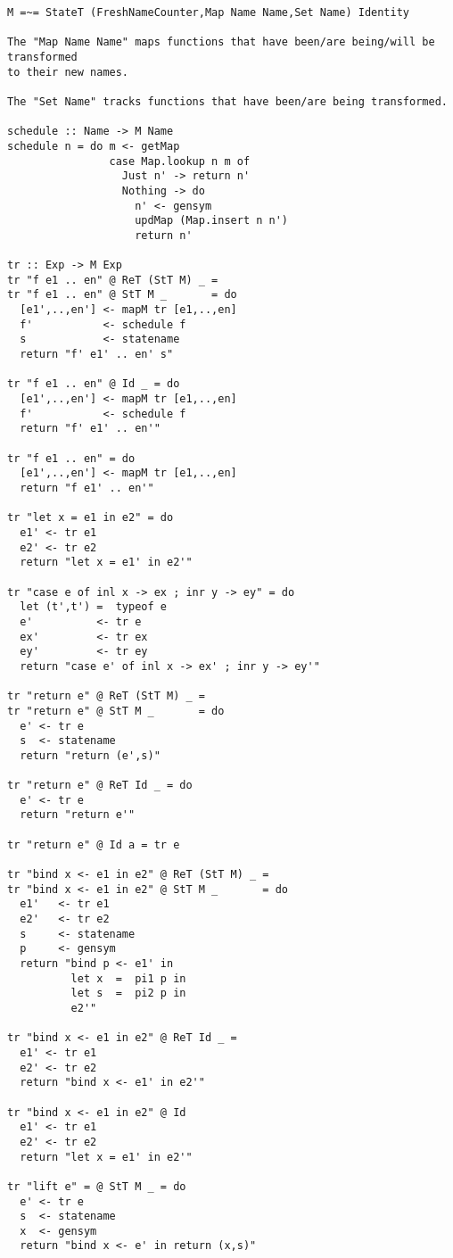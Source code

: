 \documentclass{article}[11pt]
\begin{document}
\begin{verbatim}
M =~= StateT (FreshNameCounter,Map Name Name,Set Name) Identity

The "Map Name Name" maps functions that have been/are being/will be transformed
to their new names.

The "Set Name" tracks functions that have been/are being transformed.

schedule :: Name -> M Name
schedule n = do m <- getMap
                case Map.lookup n m of
                  Just n' -> return n'
                  Nothing -> do
                    n' <- gensym
                    updMap (Map.insert n n')
                    return n'

tr :: Exp -> M Exp
tr "f e1 .. en" @ ReT (StT M) _ =
tr "f e1 .. en" @ StT M _       = do
  [e1',..,en'] <- mapM tr [e1,..,en]
  f'           <- schedule f
  s            <- statename
  return "f' e1' .. en' s"

tr "f e1 .. en" @ Id _ = do
  [e1',..,en'] <- mapM tr [e1,..,en]
  f'           <- schedule f
  return "f' e1' .. en'"

tr "f e1 .. en" = do
  [e1',..,en'] <- mapM tr [e1,..,en]
  return "f e1' .. en'"

tr "let x = e1 in e2" = do
  e1' <- tr e1
  e2' <- tr e2
  return "let x = e1' in e2'"

tr "case e of inl x -> ex ; inr y -> ey" = do
  let (t',t') =  typeof e
  e'          <- tr e
  ex'         <- tr ex
  ey'         <- tr ey
  return "case e' of inl x -> ex' ; inr y -> ey'"
  
tr "return e" @ ReT (StT M) _ =
tr "return e" @ StT M _       = do
  e' <- tr e
  s  <- statename
  return "return (e',s)"

tr "return e" @ ReT Id _ = do
  e' <- tr e
  return "return e'"

tr "return e" @ Id a = tr e

tr "bind x <- e1 in e2" @ ReT (StT M) _ =
tr "bind x <- e1 in e2" @ StT M _       = do
  e1'   <- tr e1
  e2'   <- tr e2
  s     <- statename
  p     <- gensym
  return "bind p <- e1' in
          let x  =  pi1 p in
          let s  =  pi2 p in
          e2'"

tr "bind x <- e1 in e2" @ ReT Id _ =
  e1' <- tr e1
  e2' <- tr e2
  return "bind x <- e1' in e2'"

tr "bind x <- e1 in e2" @ Id
  e1' <- tr e1
  e2' <- tr e2
  return "let x = e1' in e2'"

tr "lift e" = @ StT M _ = do
  e' <- tr e
  s  <- statename
  x  <- gensym
  return "bind x <- e' in return (x,s)"


\end{verbatim}
\end{document}

